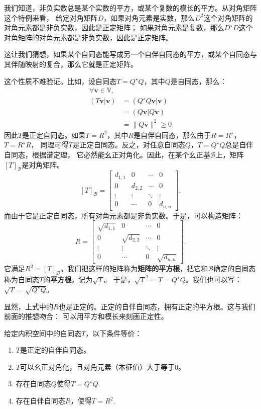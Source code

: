 \documentclass[12pt,UTF8,fontset=none]{ctexbook}
\begin{document}
我们知道，非负实数总是某个实数的平方，或某个复数的模长的平方。从对角矩阵这个特例来看，
给定对角矩阵$D$，如果对角元素是实数，那么$D^2$这个对角矩阵的对角元素都是非负实数，因此是正定矩阵；
如果对角元素是复数，那么$D^\star D$这个对角矩阵的对角元素都是非负实数，因此是正定矩阵。

这让我们猜想，如果某个自同态能写成另一个自伴自同态的平方，或某个自同态与其伴随映射的复合，那么它就是正定矩阵。

这个性质不难验证。比如，设自同态$T = Q^\star Q$，其中$Q$是自同态，那么：
\begin{align*}
    \forall \mathbf{v} \in \mathbb{V},  \\
    (T\mathbf{v} | \mathbf{v}) &= (Q^\star Q\mathbf{v} | \mathbf{v})  \\
    &= (Q\mathbf{v} | Q\mathbf{v})  \\
    &= \| Q\mathbf{v} \|^2 \geqslant 0 
\end{align*}
因此$T$是正定自同态。如果$T = R^2$，其中$R$是自伴自同态，那么由于$R = R^\star$，$T = R^\star R$，
同理可得$T$是正定自同态。反之，对任意自同态$Q$，$T = Q^\star Q$总是自伴自同态，根据谱定理，
它必然能幺正对角化。因此，在某个幺正基$\mathcal{B}$上，矩阵$[T]_\mathcal{B}$是对角矩阵。
$$ [T]_\mathcal{B} = \begin{bmatrix}
    d_{1,1} & 0 & \cdots & 0 \\
    0 & d_{2,2} & \cdots & 0 \\
    \vdots & \vdots & \ddots & \vdots \\
    0 & \cdots & 0 & d_{n,n}
\end{bmatrix}.$$
而由于它是正定自同态，所有对角元素都是非负实数。于是，可以构造矩阵：
$$ R = \begin{bmatrix}
    \sqrt{d_{1,1}} & 0 & \cdots & 0 \\
    0 & \sqrt{d_{2,2}} & \cdots & 0 \\
    \vdots & \vdots & \ddots & \vdots \\
    0 & \cdots & 0 & \sqrt{d_{n,n}}
\end{bmatrix}.$$
它满足$R^2 = [T]_\mathcal{B}$。我们把这样的矩阵称为\textbf{矩阵的平方根}，把它和$\mathcal{B}$确定的自同态称为自同态$T$的\textbf{平方根}，记为$\sqrt{T}$。
于是，$\sqrt{T}^2 = T = Q^\star Q$。我们也可以写：$\sqrt{T} = \sqrt{Q^\star Q}$。

显然，上式中的$R$也是正定的。正定的自伴自同态，拥有正定的平方根。这与我们前面的推想吻合：
可以用平方和模长来刻画正定性。
\begin{pp}\label{pp:8_12}
    给定内积空间中的自同态$T$，以下条件等价：
    \begin{enumerate}
        \item $T$是正定的自伴自同态。
        \item $T$可以幺正对角化，且对角元素（本征值）大于等于$0$。
        \item 存在自同态$Q$使得$T = Q^\star Q.$
        \item 存在自伴自同态$R$，使得$T =R^2.$
    \end{enumerate}
\end{pp}
\end{document}
